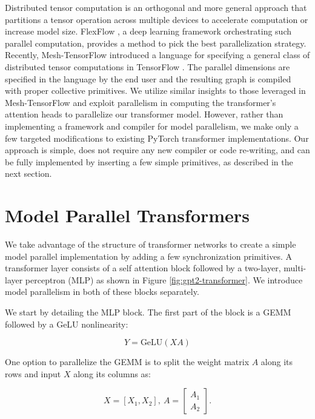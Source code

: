 Distributed tensor computation is an orthogonal and more general approach that partitions a tensor operation across multiple devices to accelerate computation or increase model size. FlexFlow \cite{FlexFlow2018}, a deep learning framework orchestrating such parallel computation, provides a method to pick the best parallelization strategy. Recently, Mesh-TensorFlow \cite{mesh_tf} introduced a language for specifying a general class of distributed tensor computations in TensorFlow \cite{tensorflow2015-whitepaper}. The parallel dimensions are specified in the language by the end user and the resulting graph is compiled with proper collective primitives. We utilize similar insights to those leveraged in Mesh-TensorFlow and exploit parallelism in computing the transformer's attention heads to parallelize our transformer model. However, rather than implementing a framework and compiler for model parallelism, we make only a few targeted modifications to existing PyTorch transformer implementations. Our approach is simple, does not require any new compiler or code re-writing, and can be fully implemented by inserting a few simple primitives, as described in the next section.

\section{Model Parallel Transformers} 
\label{model_par}

We take advantage of the structure of transformer networks to create a simple model parallel implementation by adding a few synchronization primitives. A transformer layer consists of a self attention block followed by a two-layer, multi-layer perceptron (MLP) as shown in Figure \ref{fig:gpt2-transformer}. We introduce model parallelism in both of these blocks separately.

 We start by detailing the MLP block. The first part of the block is a GEMM followed by a GeLU nonlinearity:

\begin{equation}
    Y = \textrm{GeLU}(XA)
    \label{eq:mlp-firstgemm}
 \end{equation}

 One option to parallelize the GEMM is to split the weight matrix $A$ along its rows and input $X$ along its columns as:

\begin{equation}
    X = [X_1, X_2], \
    A=\begin{bmatrix}
        A_1 \\
        A_2
    \end{bmatrix}.
 \end{equation}

